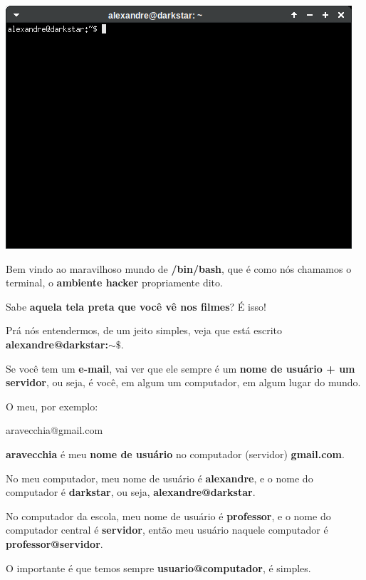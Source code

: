 \begin{multicols}{2}
\begin{center}
	\includegraphics[width=\linewidth]{./IMG-GIT/Screenshot_20231222_143805.png}
\end{center}

	Bem vindo ao maravilhoso mundo de \textbf{/bin/bash}, que é como nós chamamos o terminal, o \textbf{ambiente hacker} propriamente dito.
	
	Sabe \textbf{aquela tela preta que você vê nos filmes}? É isso!
	
	Prá nós entendermos, de um jeito simples, veja que está escrito \textbf{alexandre@darkstar:$\sim\$$}.
	
	Se você tem um \textbf{e-mail}, vai ver que ele sempre é um \textbf{nome de usuário + um servidor}, ou seja, é você, em algum um computador, em algum lugar do mundo.
	
	O meu, por exemplo:
	
	\begin{center}
		{\large aravecchia@gmail.com}
	\end{center}

\textbf{aravecchia} é meu \textbf{nome de usuário} no computador (servidor) \textbf{gmail.com}.

No meu computador, meu nome de usuário é \textbf{alexandre}, e o nome do computador é \textbf{darkstar}, ou seja, \textbf{alexandre@darkstar}.

No computador da escola, meu nome de usuário é \textbf{professor}, e o nome do computador central é \textbf{servidor}, então meu usuário naquele computador é \textbf{professor@servidor}.

O importante é que temos sempre \textbf{usuario@computador}, é simples.


\end{multicols}
